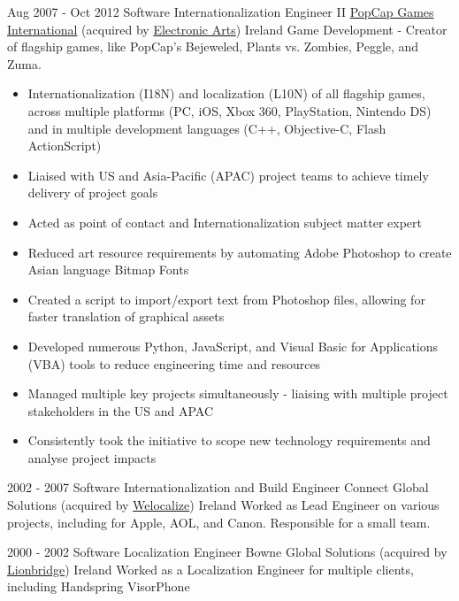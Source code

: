 \begin{twenty}
\twentyitem
  {Aug 2007 - Oct 2012}
  {Software Internationalization Engineer II}
  {{\href{https://www.popcap.com/}{PopCap Games International}}}
  {(acquired by {\href{https://www.ea.com/}{Electronic Arts}})}
  {Ireland}
  {Game Development - Creator of flagship games, like PopCap's Bejeweled, Plants vs. Zombies, Peggle, and Zuma.}
  {\begin{itemize}
    \item Internationalization (I18N) and localization (L10N) of all flagship games, across multiple platforms (PC, iOS, Xbox 360, PlayStation, Nintendo DS) and in multiple development languages (C++, Objective-C, Flash ActionScript)
    \item Liaised with US and Asia-Pacific (APAC) project teams to achieve timely delivery of project goals
    \item Acted as point of contact and Internationalization subject matter expert
  \end{itemize}}
  {\begin{itemize}
    \item Reduced art resource requirements by automating Adobe Photoshop to create Asian language Bitmap Fonts
    \item Created a script to import/export text from Photoshop files, allowing for faster translation of graphical assets
    \item Developed numerous Python, JavaScript, and Visual Basic for Applications (VBA) tools to reduce engineering time and resources
    \item Managed multiple key projects simultaneously - liaising with multiple project stakeholders in the US and APAC
    \item Consistently took the initiative to scope new technology requirements and analyse project impacts
  \end{itemize}}
\end{twenty}
\begin{twenty}
\twentyitem
  {2002 - 2007}
  {Software Internationalization and Build Engineer}
  {Connect Global Solutions}
  {(acquired by {\href{https://www.welocalize.com/}{Welocalize}})}
  {Ireland}
  {Worked as Lead Engineer on various projects, including for Apple, AOL, and Canon. Responsible for a small team.}
  {}
  {}
\end{twenty}
\begin{twenty}
\twentyitem
  {2000 - 2002}
  {Software Localization Engineer}
  {Bowne Global Solutions}
  {(acquired by {\href{https://www.lionbridge.com/}{Lionbridge}})}
  {Ireland}
  {Worked as a Localization Engineer for multiple clients, including Handspring VisorPhone}
  {}
  {}
\end{twenty}
